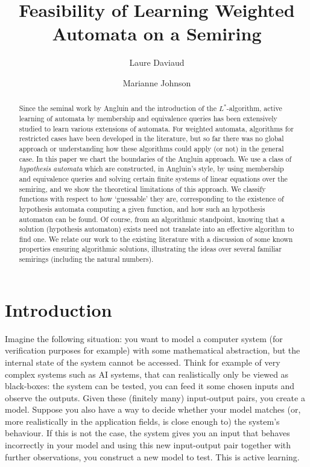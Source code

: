 \documentclass{lmcs}
\title[Learning Weighted Automata]{Feasibility of Learning Weighted Automata on a Semiring}
\author{Laure Daviaud\lmcsorcid{0000-0002-9220-7118}}[a]
\author{Marianne Johnson\lmcsorcid{0000-0003-4059-845X}}[b]
\numberwithin{theorem}{section}
\begin{document}
\begin{abstract}
\noindent Since the seminal work by Angluin and the introduction of the $L^*$-algorithm, active learning of automata by membership and equivalence queries has been extensively studied to learn various extensions of automata. For weighted automata, algorithms for restricted cases have been developed in the literature, but so far there was no global approach or understanding how these algorithms could apply (or not) in the general case. In this paper we chart the boundaries of the Angluin approach. We use a class of \textit{hypothesis automata} which are constructed, in Angluin's style, by using membership and equivalence queries and solving certain finite systems of linear equations over the semiring, and we show the theoretical limitations of this approach. We classify functions with respect to how `guessable' they are, corresponding to the existence of hypothesis automata computing a given function, and how such an hypothesis automaton can be found. Of course, from an algorithmic standpoint, knowing that a solution (hypothesis automaton) exists need not translate into an effective algorithm to find one. We  relate our work to the existing literature with a discussion of some known properties ensuring algorithmic solutions, illustrating the ideas over several familiar semirings (including the natural numbers).
\end{abstract}
\maketitle
	
\section{Introduction}\label{section:intro}
Imagine the following situation: you want to model a computer system (for verification purposes for example) with some mathematical abstraction, but the internal state of the system cannot be accessed. Think for example of very complex systems such as AI systems, that can realistically only be viewed as black-boxes: the system can be tested, you can feed it some chosen inputs and observe the outputs. Given these (finitely many)  input-output pairs, you create a model. Suppose you also have a way to decide whether your model matches (or, more realistically in the application fields, is close enough to) the system's behaviour. If this is not the case, the system gives you an input that behaves incorrectly in your model and using this new input-output pair together with further observations, you construct a new model to test. This is active learning.   
\end{document}
